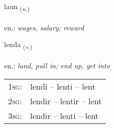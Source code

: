 \documentclass[frontgrid, backgrid]{flacards}\usepackage[]{graphicx}\usepackage[]{xcolor}
\begin{document}
\renewcommand{\flhead}{\vskip5pt \fboxsep=0pt {\small\bfseries\footnotesize Nafnorð | Noun}}
\renewcommand{\fcfoot}{\vskip5pt \fboxsep=0pt \hspace{2pt}{\small\bfseries\footnotesize 1K}}

\renewcommand{\blhead}{\vskip5pt {\small\bfseries\footnotesize Nafnorð | Noun }}
\renewcommand{\bcfoot}{\vskip5pt \hspace{2pt}{\small\bfseries\footnotesize 1K}}


{laun \small{\textsubscript{(\textit{n.})}} \\[1ex] %
\textphonetic{[lœiːn]} \\
en.: \emph{wages, salary; reward} \\  [2ex]
\renewcommand*{\arraystretch}{0.8}
}

\renewcommand{\flhead}{\vskip5pt \fboxsep=0pt {\small\bfseries\footnotesize Sagnorð | Verb}}
\renewcommand{\fcfoot}{\vskip5pt \fboxsep=0pt \hspace{2pt}{\small\bfseries\footnotesize 1K}}

\renewcommand{\blhead}{\vskip5pt {\small\bfseries\footnotesize Sagnorð | Verb }}
\renewcommand{\bcfoot}{\vskip5pt \hspace{2pt}{\small\bfseries\footnotesize 1K}}


{lenda \small{\textsubscript{(\textit{v.})}} \\[1ex] %
\textphonetic{[lɛnta]} \\
en.: \emph{land, pull in; end up, get into} \\  [2ex]
\renewcommand*{\arraystretch}{0.8}
\begin{tabular}{p{1cm}l}
\textsc{1sg}: & lendi -- lenti -- lent \\ 
\textsc{2sg}: & lendir -- lentir -- lent \\ 
\textsc{3sg}: & lendir -- lenti -- lent \\ 
\end{tabular}
}
\end{document}
